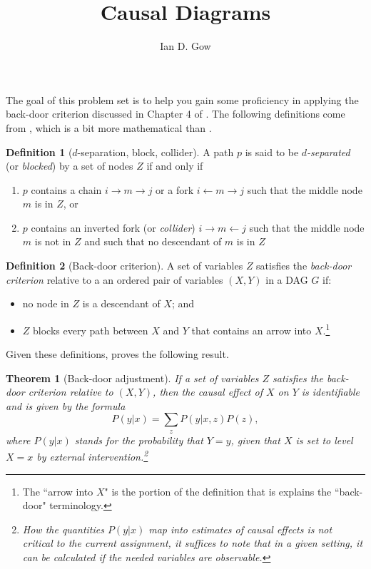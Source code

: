 \documentclass[11pt]{amsart}
\title{Causal Diagrams}
\author{Ian D. Gow}
\newtheorem{theorem}{Theorem}
\theoremstyle{definition}
\newtheorem{definition}{Definition}
\theoremstyle{question}
\begin{document}
\usetikzlibrary{automata, shapes, calc, positioning}
\maketitle



The goal of this problem set is to help you gain some proficiency in applying the back-door criterion discussed in Chapter 4 of \citet{Morgan:2014vg}. 
The following definitions come from \citet{Pearl:2009vo}, which is a bit more mathematical than \citet{Morgan:2014vg}.

\begin{definition}[$d$-separation, block, collider]
A path $p$ is said to be \emph{$d$-separated} (or \emph{blocked}) by a set of nodes $Z$ if and only if
\begin{enumerate}
	\item $p$ contains a chain $i \rightarrow m \rightarrow j$ or a fork $i \leftarrow m \rightarrow j$ such that the middle node $m$ is in $Z$, or
	\item $p$ contains an inverted fork (or \emph{collider}) $i \rightarrow m \leftarrow j$ such that the middle node $m$ is not in $Z$ and such that no descendant of $m$ is in $Z$
\end{enumerate}
\end{definition}

\begin{definition}[Back-door criterion]
A set of variables $Z$ satisfies the \emph{back-door criterion} relative to a an ordered pair of variables $(X, Y)$ in a 
	DAG $G$ if:
	\begin{itemize}
		\item no node in $Z$ is a descendant of $X$; and
		\item $Z$ blocks every path between $X$ and $Y$ that contains an arrow into $X$.\footnote{The ``arrow into $X$" is the portion of the definition that is explains the ``back-door" terminology.}
	\end{itemize}
\end{definition}

Given these definitions, \citet[p.\,79]{Pearl:2009vo}
proves the following result.
\begin{theorem}[Back-door adjustment]
	If a set of variables $Z$ satisfies the back-door criterion relative to $(X, Y)$, then the causal effect of $X$ on $Y$ is identifiable and is given by the formula 
	\[ P(y | x) = \sum_{z} P(y | x, z) P(z), \]
where $P(y|x)$ stands for the probability that $Y = y$, given that $X$ is set to level $X=x$ by external intervention.\footnote{
How the quantities $P(y|x)$ map into estimates of causal effects is not critical to the current assignment, it suffices to note that in a given setting, it can be calculated if the needed variables are observable.}
\end{theorem}
\end{document}

